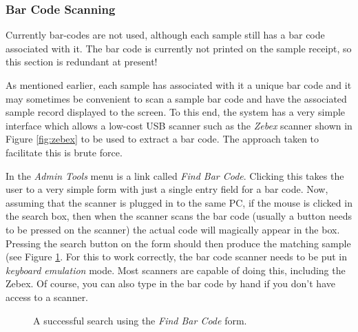 \documentclass[12pt,twoside]{article}
\begin{document}
\subsubsection{Bar Code Scanning}

\begin{plainblock}
Currently bar-codes are not used, although each sample still has
a bar code associated with it. The bar code is currently not
printed on the sample receipt, so this section is redundant
at present!
\end{plainblock}

As mentioned earlier, each sample has associated with it a unique
bar code and it may sometimes be convenient to scan a sample bar code
and have the associated sample record displayed to the screen.
To this end, the system has a very simple interface which allows
a low-cost USB scanner such as the \emph{Zebex} scanner shown in 
Figure \ref{fig:zebex} to be used to extract a bar code.
The approach taken to facilitate this is brute force.

In the \emph{Admin Tools} menu is a link called \emph{Find Bar Code}.
Clicking this takes the user to a very simple form with just a single
entry field for a bar code. Now, assuming that the scanner is plugged in to
the same PC, if the mouse is clicked in the search box, then when the
scanner scans the bar code (usually a button needs to be pressed on the 
scanner) the actual code will magically appear in the box. Pressing
the search button on the form should then produce the matching sample
(see Figure \ref{fig:barcodeform}. 
For this to work correctly, the
bar code scanner needs to be put in \emph{keyboard emulation} mode.
Most scanners are capable of doing this, including the Zebex.
Of course, you can also type in the bar code by hand if you don't
have access to a scanner.

\begin{figure}[!htb]
\begin{center}
\caption{A successful search using the \emph{Find Bar Code} form.
\label{fig:barcodeform}}
\end{center}
\end{figure}
\end{document}
